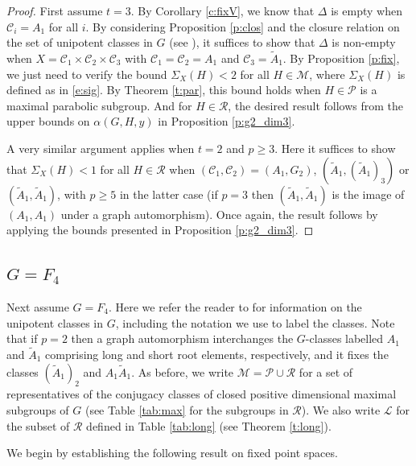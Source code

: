 \documentclass[twoside,a4paper,reqno,11pt]{amsart}
\renewcommand{\a}{\alpha}
\newcommand{\<}{\langle}
\renewcommand{\>}{\rangle}
\newcommand{\geqs}{\geqslant}
\renewcommand{\:}{\colon}
\theoremstyle{plain}
\theoremstyle{definition}
\begin{document}
\begin{proof}
First assume $t=3$. By Corollary \ref{c:fixV}, we know that $\Delta$ is empty when $\mathcal{C}_i = A_1$ for all $i$. By considering Proposition \ref{p:clos} and the closure relation on the set of unipotent classes in $G$ (see \cite[Section II.10]{Spal}), it suffices to show that $\Delta$ is non-empty when $X = \mathcal{C}_1 \times \mathcal{C}_2 \times \mathcal{C}_3$ with $\mathcal{C}_1 = \mathcal{C}_2 = A_1$ and $\mathcal{C}_3 = \tilde{A}_1$. By Proposition \ref{p:fix}, we just need to verify the bound $\Sigma_X(H)<2$ for all $H \in \mathcal{M}$, where $\Sigma_X(H)$ is defined as in \eqref{e:sig}. By Theorem \ref{t:par}, this bound holds when $H \in \mathcal{P}$ is a maximal parabolic subgroup. And for $H \in \mathcal{R}$, the desired result follows from the upper bounds on $\a(G,H,y)$ in Proposition \ref{p:g2_dim3}.

A very similar argument applies when $t=2$ and $p \geqs 3$. Here it suffices to show that $\Sigma_X(H)<1$ for all $H \in \mathcal{R}$ when $(\mathcal{C}_1,\mathcal{C}_2) = (A_1,G_2)$, $(\tilde{A}_1,(\tilde{A}_1)_3)$ or $(\tilde{A}_1,\tilde{A}_1)$, with $p \geqs 5$ in the latter case (if $p=3$ then $(\tilde{A}_1,\tilde{A}_1)$ is the image of $(A_1,A_1)$ under a graph automorphism). Once again, the result follows by applying the bounds presented in Proposition \ref{p:g2_dim3}.
\end{proof}

\subsection{$G = F_4$}\label{ss:f4}

Next assume $G = F_4$. Here we refer the reader to \cite[Table 22.1.4]{LS_book} for information on the unipotent classes in $G$, including the notation we use to label the classes. Note that if $p=2$ then a graph automorphism interchanges the $G$-classes labelled $A_1$ and $\tilde{A}_1$ comprising long and short root elements, respectively, and it fixes the classes $(\tilde{A}_1)_2$ and $A_1\tilde{A}_1$. As before, we write $\mathcal{M} = \mathcal{P} \cup \mathcal{R}$ for a set of representatives of the conjugacy classes of closed positive dimensional maximal subgroups of $G$ (see Table \ref{tab:max} for the subgroups in $\mathcal{R}$). We also write $\mathcal{L}$ for the subset of $\mathcal{R}$ defined in Table \ref{tab:long} (see Theorem \ref{t:long}). 

We begin by establishing the following result on fixed point spaces.
\end{document}
